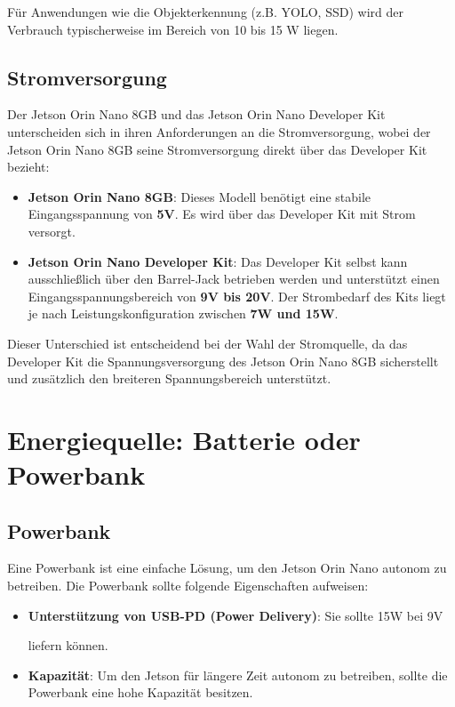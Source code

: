 \documentclass[12pt]{article}
\begin{document}
Für Anwendungen wie die Objekterkennung (z.B. YOLO, SSD) wird der Verbrauch 
\indent typischerweise im Bereich von 10 bis 15 W liegen.

\subsection{Stromversorgung}
Der Jetson Orin Nano 8GB und das Jetson Orin Nano Developer Kit unterscheiden 
sich in ihren Anforderungen an die Stromversorgung, wobei der Jetson Orin Nano 
8GB seine Stromversorgung direkt über das Developer Kit bezieht:
\begin{itemize}
    \item \textbf{Jetson Orin Nano 8GB}: Dieses Modell benötigt eine stabile 
    Eingangsspannung von \textbf{5V}. Es wird über das Developer Kit mit Strom versorgt.
    \item \textbf{Jetson Orin Nano Developer Kit}: Das Developer Kit selbst kann 
    ausschließlich über den Barrel-Jack betrieben werden und unterstützt einen 
    Eingangsspannungsbereich von \textbf{9V bis 20V}. Der Strombedarf des Kits liegt je 
    nach Leistungskonfiguration zwischen \textbf{7W und 15W}.
\end{itemize}
Dieser Unterschied ist entscheidend bei der Wahl der Stromquelle, da das Developer 
Kit die Spannungsversorgung des Jetson Orin Nano 8GB sicherstellt und zusätzlich den 
breiteren Spannungsbereich unterstützt.

\section{Energiequelle: Batterie oder Powerbank}

\subsection{Powerbank}
Eine Powerbank ist eine einfache Lösung, um den Jetson Orin Nano autonom zu betreiben. 
Die Powerbank sollte folgende Eigenschaften aufweisen:
\begin{itemize}
    \item \textbf{Unterstützung von USB-PD (Power Delivery)}: Sie sollte 15W bei 9V 
    
    liefern können.
    \item \textbf{Kapazität}: Um den Jetson für längere Zeit autonom zu betreiben, 
    sollte die Powerbank eine hohe Kapazität besitzen.
\end{itemize}
\end{document}
